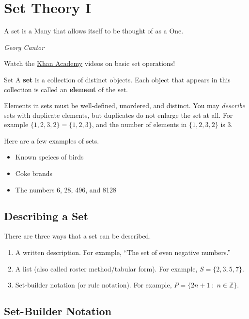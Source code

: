\chapter{Set Theory I}

\epigraph{A set is a Many that allows itself to be thought of as a One.}{\emph{Georg Cantor}}

Watch the \href{https://www.khanacademy.org/math/statistics-probability/probability-library/basic-set-ops/v/intersection-and-union-of-sets}{Khan Academy} videos on basic set operations!

\begin{boxdefine}{Set}{}
	A {\bf set} is a collection of distinct objects. Each object that appears in this collection is called an {\bf element} of the set.
\end{boxdefine}

Elements in sets must be well-defined, unordered, and distinct. You may \emph{describe} sets with duplicate elements, but duplicates do not enlarge the set at all. For example $\{1,2,3,2\}=\{1,2,3\}$, and the number of elements in $\{1,2,3,2\}$ is 3.

\begin{boxexample}{}{}
	Here are a few examples of sets.

	\begin{itemize}
		\item Known speices of birds
		\item Coke brands
		\item The numbers 6, 28, 496, and 8128
	\end{itemize}
\end{boxexample}

\section{Describing a Set}

There are three ways that a set can be described.

\begin{enumerate}
	\item A written description. For example, ``The set of even negative numbers.''
	\item A list (also called roster method/tabular form). For example, $S = \{2,3,5,7\}$.
	\item Set-builder notation (or rule notation). For example, $P = \{2n+1\;:\;n \in \mathbb{Z}\}$.
\end{enumerate}

\section{Set-Builder Notation}

